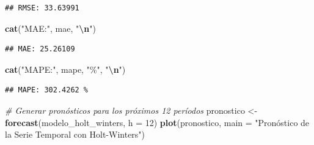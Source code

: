\documentclass[
]{book}
\newenvironment{Shaded}{\begin{snugshade}}{\end{snugshade}}
\newcommand{\AttributeTok}[1]{\textcolor[rgb]{0.13,0.29,0.53}{#1}}
\newcommand{\CommentTok}[1]{\textcolor[rgb]{0.56,0.35,0.01}{\textit{#1}}}
\newcommand{\DecValTok}[1]{\textcolor[rgb]{0.00,0.00,0.81}{#1}}
\newcommand{\FunctionTok}[1]{\textcolor[rgb]{0.13,0.29,0.53}{\textbf{#1}}}
\newcommand{\NormalTok}[1]{#1}
\newcommand{\OtherTok}[1]{\textcolor[rgb]{0.56,0.35,0.01}{#1}}
\newcommand{\SpecialCharTok}[1]{\textcolor[rgb]{0.81,0.36,0.00}{\textbf{#1}}}
\newcommand{\StringTok}[1]{\textcolor[rgb]{0.31,0.60,0.02}{#1}}
\begin{document}
\begin{Shaded}
\end{Shaded}

\begin{verbatim}
## RMSE: 33.63991
\end{verbatim}

\begin{Shaded}
\begin{Highlighting}[]
\FunctionTok{cat}\NormalTok{(}\StringTok{"MAE:"}\NormalTok{, mae, }\StringTok{"}\SpecialCharTok{\textbackslash{}n}\StringTok{"}\NormalTok{)}
\end{Highlighting}
\end{Shaded}

\begin{verbatim}
## MAE: 25.26109
\end{verbatim}

\begin{Shaded}
\begin{Highlighting}[]
\FunctionTok{cat}\NormalTok{(}\StringTok{"MAPE:"}\NormalTok{, mape, }\StringTok{"\%"}\NormalTok{, }\StringTok{"}\SpecialCharTok{\textbackslash{}n}\StringTok{"}\NormalTok{)}
\end{Highlighting}
\end{Shaded}

\begin{verbatim}
## MAPE: 302.4262 %
\end{verbatim}

\begin{Shaded}
\begin{Highlighting}[]
\CommentTok{\# Generar pronósticos para los próximos 12 períodos}
\NormalTok{pronostico }\OtherTok{\textless{}{-}} \FunctionTok{forecast}\NormalTok{(modelo\_holt\_winters, }\AttributeTok{h =} \DecValTok{12}\NormalTok{)}
\FunctionTok{plot}\NormalTok{(pronostico, }\AttributeTok{main =} \StringTok{"Pronóstico de la Serie Temporal con Holt{-}Winters"}\NormalTok{)}
\end{Highlighting}
\end{Shaded}
\end{document}
